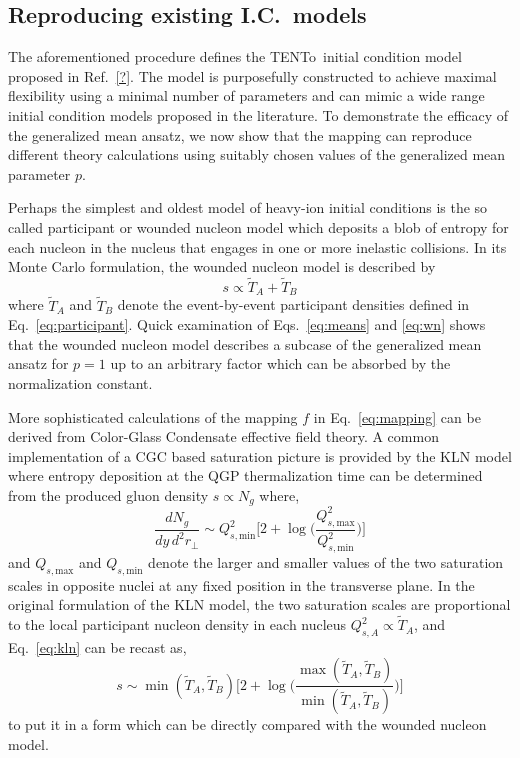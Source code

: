 \documentclass[aps,prc,reprint,amsmath,nofootinbib,superscriptaddress]{revtex4-1}
\newcommand{\trento}{T\raisebox{-0.5ex}{R}ENTo}
\newcommand{\T}{\tilde{T}}
\newcommand{\Qs}[1]{Q_{s,\text{#1}}}
\begin{document}
\subsection{Reproducing existing I.C.\ models}


The aforementioned procedure defines the \trento\ initial condition model proposed in Ref.~\ref{?}.
The model is purposefully constructed to achieve maximal flexibility using a minimal number of parameters and can mimic a wide range initial condition models proposed in the literature.
To demonstrate the efficacy of the generalized mean ansatz, we now show that the mapping can reproduce different theory calculations using suitably chosen values of the generalized mean parameter $p$.

Perhaps the simplest and oldest model of heavy-ion initial conditions is the so called participant or wounded nucleon model which deposits a blob of entropy for each nucleon in the nucleus that engages in one or more inelastic collisions.
In its Monte Carlo formulation, the wounded nucleon model is described by
\begin{equation}
  s \propto \T_A + \T_B
  \label{eq:wn}
\end{equation}
where $\T_A$ and $\T_B$ denote the event-by-event participant densities defined in Eq.~\eqref{eq:participant}.
Quick examination of Eqs.~\eqref{eq:means} and \eqref{eq:wn} shows that the wounded nucleon model describes a subcase of the generalized mean ansatz for $p=1$ up to an arbitrary factor which can be absorbed by the normalization constant.

More sophisticated calculations of the mapping $f$ in Eq.~\eqref{eq:mapping} can be derived from Color-Glass Condensate effective field theory.
A common implementation of a CGC based saturation picture is provided by the KLN model where entropy deposition at the QGP thermalization time can be determined from the produced gluon density $s \propto N_g$ where,
\begin{equation}
  \frac{dN_g}{dy\,d^2r_\perp} \sim \Qs{min}^2 \biggl[
    2 + \log \biggl(\frac{\Qs{max}^2}{\Qs{min}^2} \biggr)
  \biggr]
  \label{eq:kln}
\end{equation}
and $\Qs{max}$ and $\Qs{min}$ denote the larger and smaller values of the two saturation scales in opposite nuclei at any fixed position in the transverse plane.
In the original formulation of the KLN model, the two saturation scales are proportional to the local participant nucleon density in each nucleus $Q^2_{s,A} \propto \T_A$, and Eq.~\eqref{eq:kln} can be recast as,
\begin{equation}
  s \sim \min(\T_A, \T_B) \biggl[
    2 + \log \biggl(\frac{\max(\T_A,\T_B)}{\min(\T_A,\T_B)}\biggr)
  \biggr]
\end{equation}
to put it in a form which can be directly compared with the wounded nucleon model.
\end{document}
